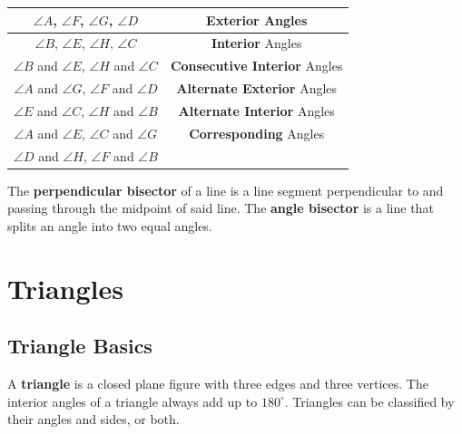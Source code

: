\documentclass{article}
\begin{document}
            \begin{center}
                \begin{tabular} {|c|c|}
                    \hline
                    $\angle A$, $\angle F$, $\angle G$, $\angle D$ & \textbf{Exterior} Angles \\
                    \hline
                    $\angle B$, $\angle E$, $\angle H$, $\angle C$ & \textbf{Interior} Angles \\
                    \hline
                    $\angle B$ and $\angle E$, $\angle H$ and $\angle C$ &\textbf{Consecutive Interior} Angles \\
                    \hline
                    $\angle A$ and $\angle G$, $\angle F$ and $\angle D$ & \textbf{Alternate Exterior} Angles \\
                    \hline
                    $\angle E$ and $\angle C$, $\angle H$ and $\angle B$ & \textbf{Alternate Interior} Angles \\
                    \hline
                    $\angle A$ and $\angle E$, $\angle C$ and $\angle G$ & \textbf{Corresponding} Angles \\
                    $\angle D$ and $\angle H$, $\angle F$ and $\angle B$ & \\
                    \hline
                \end{tabular}
            \end{center}
%
            \noindent The \textbf{perpendicular bisector} of a line is a line segment perpendicular
            to and passing through the midpoint of said line. The \textbf{angle bisector} is a line
            that splits an angle into two equal angles.

    \pagebreak

    \section{Triangles}

        \subsection{Triangle Basics}
            A \textbf{triangle} is a closed plane figure with three edges and three vertices.
            The interior angles of a triangle always add up to $180^\circ$. Triangles can be
            classified by their angles and sides, or both. \\
\end{document}
